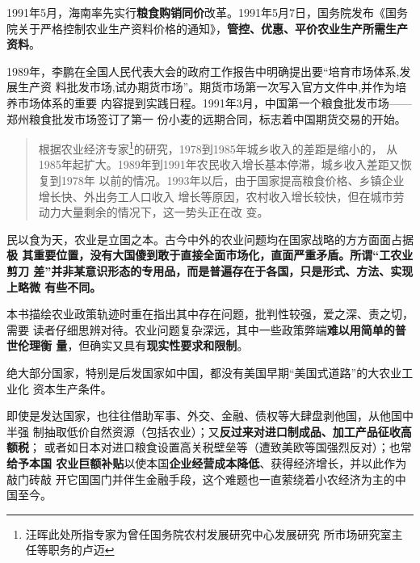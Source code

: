 1991年5月，海南率先实行\textbf{粮食购销同价}改革。1991年5月7日，国务院发布《国务
院关于严格控制农业生产资料价格的通知》，\textbf{管控、优惠、平价农业生产所需生产
  资料}。

1989年，李鹏在全国人民代表大会的政府工作报告中明确提出要“培育市场体系,发展生产资
料批发市场,试办期货市场”。期货市场第一次写入官方文件中,并作为培养市场体系的重要
内容提到实践日程。1991年3月，中国第一个粮食批发市场——郑州粮食批发市场签订了第一
份小麦的远期合同，标志着中国期货交易的开始。\cite{taochangsheng}



\begin{quotation}
  根据农业经济专家\footnote{汪晖此处所指专家为曾任国务院农村发展研究中心发展研究
    所市场研究室主任等职务的卢迈}的研究，1978到1985年城乡收入的差距是缩小的，
  从1985年起扩大。1989年到1991年农民收入增长基本停滞，城乡收入差距又恢复到1978年
  以前的情况。1993年以后，由于国家提高粮食价格、乡镇企业增长快、外出务工人口收入
  增长等原因，农村收入增长较快，但在城市劳动力大量剩余的情况下，这一势头正在改
  变。\cite{wangxiandai}

\end{quotation}


民以食为天，农业是立国之本。古今中外的农业问题均在国家战略的方方面面占据\textbf{极
  其重要位置，没有大国傻到敢于直接全面市场化，直面严重矛盾。所谓“工农业剪刀
  差”并非某意识形态的专用品，而是普遍存在于各国，只是形式、方法、实现上略微
  有些不同。}


本书描绘农业政策轨迹时重在指出其中存在问题，批判性较强，爱之深、责之切，需要
读者仔细思辨对待。农业问题复杂深远，其中一些政策弊端\textbf{难以用简单的普世伦理衡
  量}，但确实又具有\textbf{现实性要求和限制}。

绝大部分国家，特别是后发国家如中国，都没有美国早期“美国式道路”的大农业工业化
资本生产条件。

即使是发达国家，也往往借助军事、外交、金融、债权等大肆盘剥他国，从他国中半强
制抽取低价自然资源（包括农业）；又\textbf{反过来对进口制成品、加工产品征收高额税}；
或者如日本对进口粮食设置高关税壁垒等（遭致美欧等国强烈反对）；也常\textbf{给予本国
  农业巨额补贴}以使本国\textbf{企业经营成本降低}、获得经济增长，并以此作为敲门砖敲
开它国国门并伴生金融手段，这个难题也一直萦绕着小农经济为主的中国至今。


